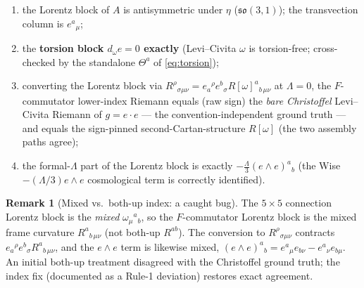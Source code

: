 \documentclass[11pt]{article}
\newcommand{\eu}{e}
\newcommand{\om}{\omega}
\theoremstyle{definition}\newtheorem{remark}{Remark}
\theoremstyle{plain}\newtheorem{proposition}{Proposition}
\begin{document}
\begin{enumerate}
\item the Lorentz block of $A$ is antisymmetric under $\eta$ ($\mathfrak{so}(3,1)$); the transvection
column is $\eu^a{}_\mu$;
\item the \textbf{torsion block $d_\om \eu=0$ exactly} (Levi--Civita $\om$ is torsion-free; cross-checked
by the standalone $\Theta^a$ of \eqref{eq:torsion});
\item converting the Lorentz block via $R^\rho{}_{\sigma\mu\nu}=\eu_a{}^\rho \eu^b{}_\sigma
R[\om]^a{}_{b\,\mu\nu}$ at $\Lambda=0$, the $F$-commutator lower-index Riemann equals (raw sign) the
\emph{bare Christoffel} Levi--Civita Riemann of $g=\eu\cdot\eu$ --- the convention-independent ground
truth --- and equals the sign-pinned second-Cartan-structure $R[\om]$ (the two assembly paths agree);
\item the formal-$\Lambda$ part of the Lorentz block is exactly $-\tfrac{\Lambda}{3}(\eu\wedge \eu)^a{}_b$
(the Wise $-(\Lambda/3)\eu\wedge \eu$ cosmological term is correctly identified).
\end{enumerate}
\begin{remark}[Mixed vs.\ both-up index: a caught bug]
The $5\times5$ connection Lorentz block is the \emph{mixed} $\om_\mu{}^a{}_b$, so the $F$-commutator
Lorentz block is the mixed frame curvature $R^a{}_{b\,\mu\nu}$ (not both-up $R^{ab}$). The conversion
to $R^\rho{}_{\sigma\mu\nu}$ contracts $\eu_a{}^\rho \eu^b{}_\sigma R^a{}_{b\,\mu\nu}$, and the
$\eu\wedge \eu$ term is likewise mixed, $(\eu\wedge \eu)^a{}_b=\eu^a{}_\mu \eu_{b\nu}-\eu^a{}_\nu \eu_{b\mu}$.
An initial both-up treatment disagreed with the Christoffel ground truth; the index fix (documented as a
Rule-1 deviation) restores exact agreement.
\end{remark}
\end{document}
